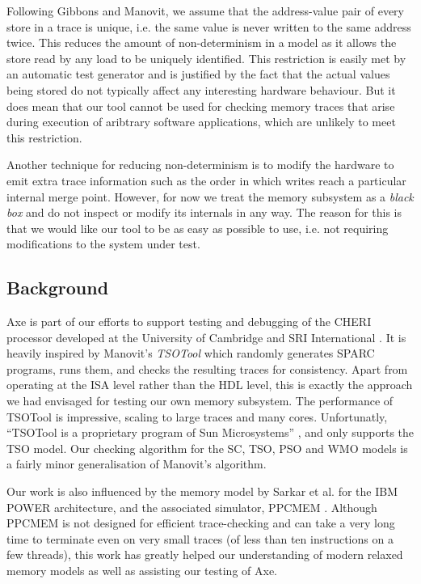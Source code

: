 \documentclass[11pt]{article}
\begin{document}
Following Gibbons \cite{Gibbons} and Manovit\cite{Manovit}, we assume
that the address-value pair of every store in a trace is unique, i.e.
the same value is never written to the same address twice.  This
reduces the amount of non-determinism in a model as it allows the
store read by any load to be uniquely identified. This restriction is
easily met by an automatic test generator and is justified by the
fact that the actual values being stored do not typically affect any
interesting hardware behaviour.  But it does mean that our tool cannot
be used for checking memory traces that arise during execution of
aribtrary software applications, which are unlikely to meet this
restriction.

Another technique for reducing non-determinism is to modify the
hardware to emit extra trace information such as the order in which
writes reach a particular internal merge point.  However, for now we
treat the memory subsystem as a \emph{black box} and do not inspect or
modify its internals in any way.  The reason for this is that we would
like our tool to be as easy as possible to use, i.e. not requiring
modifications to the system under test.


\subsection{Background}

Axe is part of our efforts to support testing and debugging of the
CHERI processor developed at the University of Cambridge and SRI
International \cite{CHERI}.  It is heavily inspired by Manovit's
\emph{TSOTool} \cite{Manovit,TSOTool} which randomly generates SPARC
programs, runs them, and checks the resulting traces for consistency.
Apart from operating at the ISA level rather than the HDL level, this
is exactly the approach we had envisaged for testing our own memory
subsystem.  The performance of TSOTool is impressive, scaling to large
traces and many cores.  Unfortunatly, ``TSOTool is a proprietary
program of Sun Microsystems'' \cite{TSOTool}, and only supports the
TSO model.  Our checking algorithm for the SC, TSO, PSO and WMO models
is a fairly minor generalisation of Manovit's algorithm.

Our work is also influenced by the memory model by Sarkar et al.
\cite{POWER} for the IBM POWER architecture, and the associated
simulator, PPCMEM \cite{PPCMEM}.  Although PPCMEM is not designed for
efficient trace-checking and can take a very long time to terminate
even on very small traces (of less than ten instructions on a few
threads), this work has greatly helped our understanding of modern
relaxed memory models as well as assisting our testing of Axe.
\end{document}

